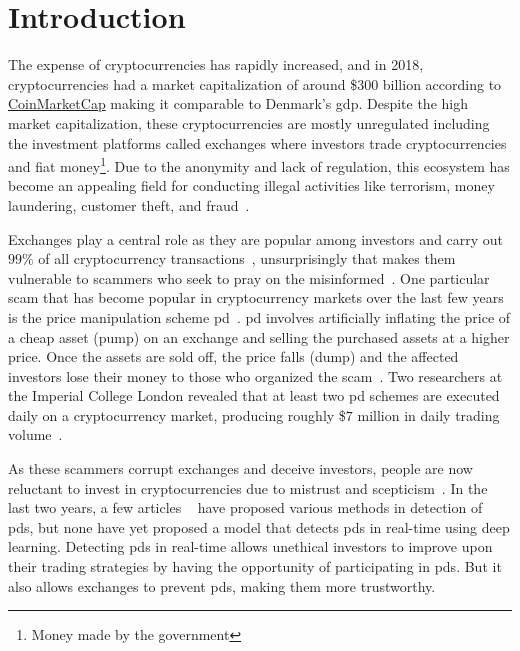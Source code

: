 
\chapter{Introduction}\label{ch:introduction}\glsresetall
The expense of cryptocurrencies has rapidly increased, and in 2018, cryptocurrencies had a market capitalization of around \$$300$ billion according to \href{https://coinmarketcap.com/}{CoinMarketCap} making it comparable to Denmark's \ac{gdp}\cite{P&D_to_the_moon}. Despite the high market capitalization, these cryptocurrencies are mostly unregulated including the investment platforms called exchanges where investors trade cryptocurrencies and fiat money\footnote{Money made by the government\cite{fiat}}. Due to the anonymity and lack of regulation, this ecosystem has become an appealing field for conducting illegal activities like terrorism, money laundering, customer theft, and fraud~\cite{bitcoin_regulation}.

Exchanges play a central role as they are popular among investors and carry out $99\%$ of all cryptocurrency transactions~\cite{coinsutra}, unsurprisingly that makes them vulnerable to scammers who seek to pray on the misinformed~\cite{P&D_to_the_moon}. One particular scam that has become popular in cryptocurrency markets over the last few years is the price manipulation scheme \ac{pd}~\cite{P&D_anatomy}. \ac{pd} involves artificially inflating the price of a cheap asset (pump) on an exchange and selling the purchased assets at a higher price. Once the assets are sold off, the price falls (dump) and the affected investors lose their money to those who organized the scam~\cite{P&D_scheme}. Two researchers at the Imperial College London revealed that at least two \ac{pd} schemes are executed daily on a cryptocurrency market, producing roughly \$$7$ million in daily trading volume~\cite{P&D_anatomy}.

As these scammers corrupt exchanges and deceive investors, people are now reluctant to invest in cryptocurrencies due to mistrust and scepticism~\cite{anchor}. In the last two years, a few articles ~\cite{P&D_to_the_moon, P&D_anatomy, P&D_scheme, P&D_pumping} have proposed various methods in detection of \acp{pd}, but none have yet proposed a model that detects \acp{pd} in real-time using deep learning. Detecting \acp{pd} in real-time allows unethical investors to improve upon their trading strategies by having the opportunity of participating in \acp{pd}. But it also allows exchanges to prevent \acp{pd}, making them more trustworthy. 

